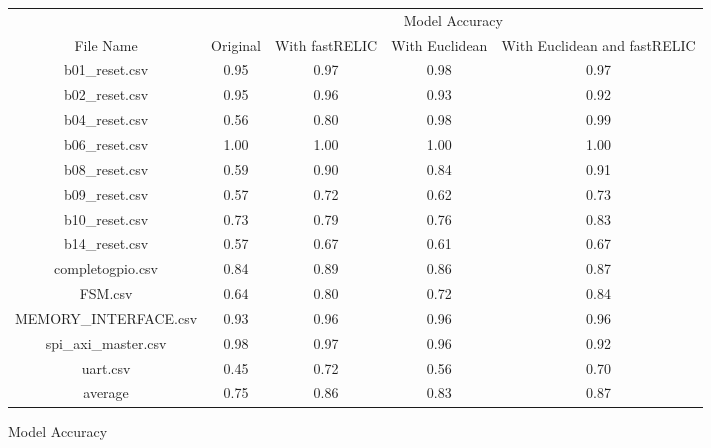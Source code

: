 \begin{tabular}{|c|c|c|c|c|}
    \hline
     & \multicolumn{4}{c|}{Model Accuracy}\\
    \cline {2-5}
    File Name & Original & With fastRELIC & With Euclidean & With Euclidean and fastRELIC\\
    \hline
    \hline
    b01\_reset.csv & 0.95 & 0.97 & 0.98 & 0.97\\
    \hline
    b02\_reset.csv & 0.95 & 0.96 & 0.93 & 0.92\\
    \hline
    b04\_reset.csv & 0.56 & 0.80 & 0.98 & 0.99\\
    \hline
    b06\_reset.csv & 1.00 & 1.00 & 1.00 & 1.00\\
    \hline
    b08\_reset.csv & 0.59 & 0.90 & 0.84 & 0.91\\
    \hline
    b09\_reset.csv & 0.57 & 0.72 & 0.62 & 0.73\\
    \hline
    b10\_reset.csv & 0.73 & 0.79 & 0.76 & 0.83\\
    \hline
    b14\_reset.csv & 0.57 & 0.67 & 0.61 & 0.67\\
    \hline
    completogpio.csv & 0.84 & 0.89 & 0.86 & 0.87\\
    \hline
    FSM.csv & 0.64 & 0.80 & 0.72 & 0.84\\
    \hline
    MEMORY\_INTERFACE.csv & 0.93 & 0.96 & 0.96 & 0.96\\
    \hline
    spi\_axi\_master.csv & 0.98 & 0.97 & 0.96 & 0.92\\
    \hline
    uart.csv & 0.45 & 0.72 & 0.56 & 0.70\\
    \hline
    \hline
    average & 0.75 & 0.86 & 0.83 & 0.87\\
    \hline
\end{tabular}
\caption{Model Accuracy}
\label{tab:Model Accuracy No Feature Selection}
